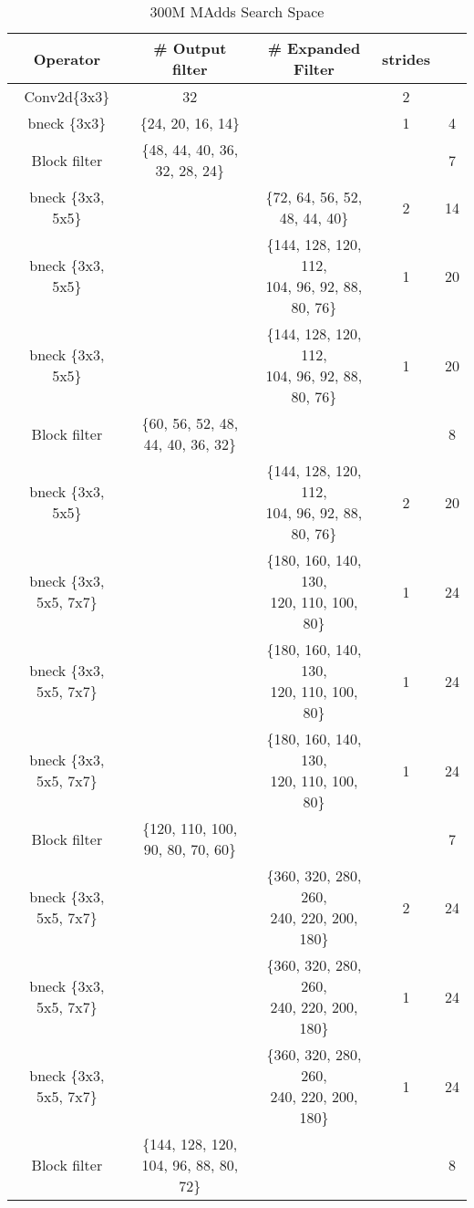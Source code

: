\begin{table}
\caption{300M MAdds Search Space} 
\begin{center}

\begin{tabular}[hp]{c|c|c|c|c}
\hline
\hline
 Operator  &\# Output filter &\# Expanded Filter &strides & \\ 
\hline
  Conv2d\{3x3\} &32 & &2 \\
\hline
  bneck \{3x3\} & \{24, 20, 16, 14\} & &1  &4\\
\hline
  Block filter &\{48, 44, 40, 36, 32, 28, 24\} & &  &7\\
  bneck \{3x3, 5x5\} & &\{72, 64, 56, 52, 48, 44, 40\} &2  &14\\
  bneck \{3x3, 5x5\} & &\shortstack{\{144, 128, 120, 112, \\ 104, 96, 92, 88, 80, 76\}} &1 &20 \\
  bneck \{3x3, 5x5\} & &\shortstack{\{144, 128, 120, 112, \\ 104, 96, 92, 88, 80, 76\}} &1 &20 \\
\hline
Block filter &\{60, 56, 52, 48, 44, 40, 36, 32\} & &  &8\\
  bneck \{3x3, 5x5\} & &\shortstack{\{144, 128, 120, 112, \\ 104, 96, 92, 88, 80, 76\}} &2 &20\\
  bneck \{3x3, 5x5, 7x7\} & &\shortstack{\{180, 160, 140, 130,\\ 120, 110, 100, 80\}} &1 &24 \\
  bneck \{3x3, 5x5, 7x7\} & &\shortstack{\{180, 160, 140, 130, \\120, 110, 100, 80\}} &1 &24 \\
  bneck \{3x3, 5x5, 7x7\} & &\shortstack{\{180, 160, 140, 130, \\120, 110, 100, 80\}} &1 &24 \\
\hline
Block filter &\{120, 110, 100, 90, 80, 70, 60\} & & &7 \\
  bneck \{3x3, 5x5, 7x7\} & &\shortstack{\{360, 320, 280, 260, \\ 240, 220, 200, 180\}} &2 &24 \\
  bneck \{3x3, 5x5, 7x7\} & &\shortstack{\{360, 320, 280, 260, \\ 240, 220, 200, 180\}} &1 &24 \\
  bneck \{3x3, 5x5, 7x7\} & &\shortstack{\{360, 320, 280, 260, \\ 240, 220, 200, 180\}} &1 &24 \\
\hline
Block filter &\{144, 128, 120, 104, 96, 88, 80, 72\} & & &8 \\

\end{tabular}
\end{center}
\end{table}
